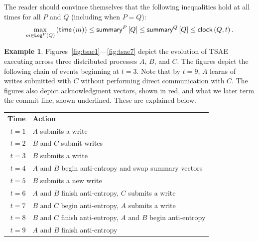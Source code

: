 \documentclass[]             %
{NASA}                       %
\theoremstyle{definition}
\newtheorem{example}[theorem]{Example}
\begin{document}
The reader should convince themselves that the following inequalities
hold at all times for all $P$ and $Q$ (including when $P = Q$):
\[
  \max_{m \in \mathsf{Log}^{P}\left(Q\right)}\left({\mathsf{time}\left(m\right)}\right) \leq \mathsf{summary}^{P}\left[Q\right] \leq \mathsf{summary}^{Q}\left[Q\right] \leq \mathsf{clock}\left(Q,t\right).
\]

\begin{example}
  \label{ex:tsae}
  Figures~\ref{fig:tsae1}---\ref{fig:tsae7} depict the evolution of
  TSAE executing across three distributed processes $A$, $B$, and
  $C$. The figures depict the following chain of events beginning at
  $t = 3$. Note that by $t = 9$, $A$ learns of writes submitted with
  $C$ without performing direct communication with $C$. The figures
  also depict acknowledgment vectors, shown in red, and what we later
  term the commit line, shown underlined. These are explained below.

  \begin{centering}
    \begin{tabular}{rl}\\
      \textbf{Time}    & \textbf{Action} \\
      $t = 1$   & $A$ submits a write                                            \\
      $t = 2$   & $B$ and $C$ submit writes                                      \\
      $t = 3$   & $B$ submits a write                                            \\
      $t = 4$ & $A$ and $B$ begin anti-entropy and swap summary vectors \\
      $t = 5$ & $B$ submits a new write  \\
      $t = 6$ & $A$ and $B$ finish anti-entropy, $C$ submits a write \\
      $t = 7$ & $B$ and $C$ begin anti-entropy, $A$ submits a write \\
      $t = 8$ & $B$ and $C$ finish anti-entropy, $A$ and $B$ begin anti-entropy \\
      $t = 9$ & $A$ and $B$ finish anti-entropy
    \end{tabular}
  \end{centering}
\end{example}
\end{document}
